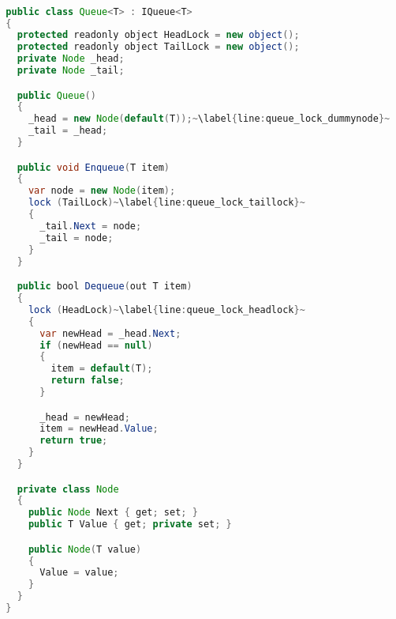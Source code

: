\begin{lstlisting}[label=lst:impl_queue_lock,
  caption={Lock based Concurrent Queue Implementation},
  language=Java,  
  showspaces=false,
  showtabs=false,
  breaklines=true,
  showstringspaces=false,
  breakatwhitespace=true,
  commentstyle=\color{greencomments},
  keywordstyle=\color{bluekeywords},
  stringstyle=\color{redstrings},
  escapechar=~,
  morekeywords={atomic, retry, orelse, var, get, set, ref, out, readonly, virtual, override, lock}]  % Start your code-block

  public class Queue<T> : IQueue<T>
  {
    protected readonly object HeadLock = new object();
    protected readonly object TailLock = new object();
    private Node _head;
    private Node _tail;

    public Queue()
    {
      _head = new Node(default(T));~\label{line:queue_lock_dummynode}~
      _tail = _head;
    }

    public void Enqueue(T item)
    {
      var node = new Node(item);
      lock (TailLock)~\label{line:queue_lock_taillock}~
      {
        _tail.Next = node;
        _tail = node;
      }
    }

    public bool Dequeue(out T item)
    {
      lock (HeadLock)~\label{line:queue_lock_headlock}~
      {
        var newHead = _head.Next;
        if (newHead == null)
        {
          item = default(T);
          return false;
        }

        _head = newHead;
        item = newHead.Value;
        return true;
      }
    }

    private class Node
    {
      public Node Next { get; set; }
      public T Value { get; private set; }

      public Node(T value)
      {
        Value = value;
      }
    }
  }

\end{lstlisting}

